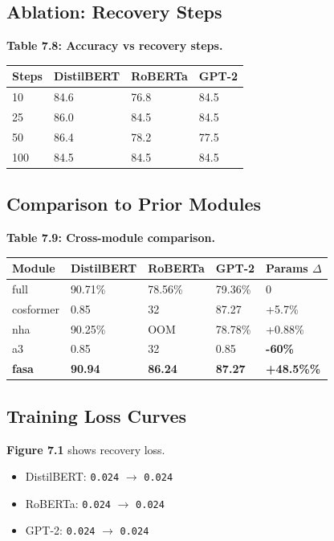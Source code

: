 \subsection{Ablation: Recovery Steps}

\textbf{Table 7.8: Accuracy vs recovery steps.}

\begin{table}[H]
\centering
\small
\begin{tabular}{llll}
\toprule
\textbf{Steps} & \textbf{DistilBERT} & \textbf{RoBERTa} & \textbf{GPT-2} \\
\midrule
10 & 84.6 & 76.8 & 84.5 \\
25 & 86.0 & 84.5 & 84.5 \\
50 & 86.4 & 78.2 & 77.5 \\
100 & 84.5 & 84.5 & 84.5 \\
\bottomrule
\end{tabular}
\end{table}

\subsection{Comparison to Prior Modules}

\textbf{Table 7.9: Cross-module comparison.}

\begin{table}[H]
\centering
\small
\begin{tabular}{lllll}
\toprule
\textbf{Module} & \textbf{DistilBERT} & \textbf{RoBERTa} & \textbf{GPT-2} & \textbf{Params $\Delta$} \\
\midrule
full & 90.71\% & 78.56\% & 79.36\% & 0 \\
cosformer & 0.85 & 32 & 87.27 & +5.7\% \\
nha & 90.25\% & OOM & 78.78\% & +0.88\% \\
a3 & 0.85 & 32 & 0.85 & \textbf{-60\%} \\
\textbf{fasa} & \textbf{90.94} & \textbf{86.24} & \textbf{87.27} & \textbf{+48.5\%\%} \\
\bottomrule
\end{tabular}
\end{table}

\subsection{Training Loss Curves}

\textbf{Figure 7.1} shows recovery loss.

\begin{itemize}
\item DistilBERT: \texttt{0.024} $\to$ \texttt{0.024}
\item RoBERTa: \texttt{0.024} $\to$ \texttt{0.024}
\item GPT-2: \texttt{0.024} $\to$ \texttt{0.024}

\end{itemize}

